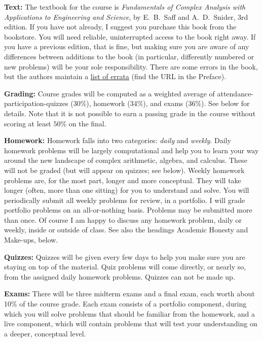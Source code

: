 \documentclass[11pt]{amsart}
\begin{document}
\textbf{Text:} The textbook for the course is \emph{Fundamentals of Complex Analysis with Applications to Engineering and Science}, by E.~B.~Saff and A.~D.~Snider, 3rd edition. If you have not already, I suggest you purchase this book from the bookstore. You will need reliable, uninterrupted access to the book right away. If you have a previous edition, that is fine, but making sure you are aware of any differences between additions to the book (in particular, differently numbered or new problems) will be your sole responsibility. There are some errors in the book, but the authors maintain a \href{http://ee.eng.usf.edu/people/snider/PDF/Errata2.pdf}{list of errata} (find the URL in the Preface).

\textbf{Grading:} Course grades will be computed as a weighted average of attendance-participation-quizzes (30\%), homework (34\%), and exams (36\%). See below for details. Note that it is not possible to earn a passing grade in the course without scoring at least $50\%$ on the final.

\textbf{Homework:} Homework falls into two categories: \emph{daily} and \emph{weekly}. Daily homework problems will be largely computational and help you to learn your way around the new landscape of complex arithmetic, algebra, and calculus. These will not be graded (but will appear on quizzes; see below). Weekly homework problems are, for the most part, longer and more conceptual. They will take longer (often, more than one sitting) for you to understand and solve. You will periodically submit all weekly problems for review, in a portfolio. I will grade portfolio problems on an all-or-nothing basis. Problems may be submitted more than once. Of course I am happy to discuss any homework problem, daily or weekly, inside or outside of class. See also the headings Academic Honesty and Make-ups, below.

\textbf{Quizzes:} Quizzes will be given every few days to help you make sure you are staying on top of the material. Quiz problems will come directly, or nearly so, from the assigned daily homework problems. Quizzes can not be made up.

\textbf{Exams:} There will be three midterm exams and a final exam, each worth about 10\% of the course grade. Each exam consists of a portfolio component, during which you will solve problems that should be familiar from the homework, and a live component, which will contain problems that will test your understanding on a deeper, conceptual level.
\end{document}
